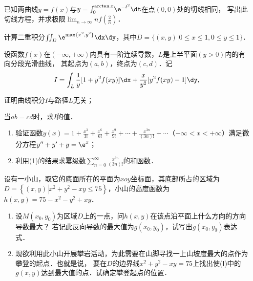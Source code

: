 \documentclass[plain,noanswer,medmath]{../../template/jnuexam}
\begin{document}

\begin{problem}
已知两曲线$y = f(x)$与$y = \int_0^{\arctan x} \!\e^{- t^2} \dt$在点$(0,0)$处的切线相同，
写出此切线方程，并求极限$\lim_{n \to \infty} nf\left(\frac{2}{n} \right)$．
\end{problem}



\begin{problem}
计算二重积分$\iint_D \e^{\max \{x^2,y^2\}} \dx\dy$，其中$D = \{(x,y)|0 \le x \le 1,0 \le y \le 1\}$．
\end{problem}



\begin{problem}
设函数$f(x)$在$(-\infty , +\infty)$内具有一阶连续导数，$L$是上半平面$(y > 0)$内的有向分段光滑曲线，
其起点为$(a,b)$，终点为$(c,d)$．记
$$I = \int_L \frac{1}{y} [1 + y^2 f(xy)]\dx + \frac{x}{y^2}[y^2 f(xy) - 1]\dy,$$
\begin{enumerate*}
\item 证明曲线积分$I$与路径$L$无关；\item 当$ab = cd$时，求$I$的值．
\end{enumerate*}

\end{problem}



\begin{problem}
\begin{enumerate}
  \item 验证函数$y(x) = 1 + \frac{x^3}{3!} + \frac{x^6}{6!} + \frac{x^9}{9!}
        + \cdots + \frac{x^{3n}}{(3n)!}+ \cdots$（$-\infty < x < +\infty$）满足微分方程$y'' + y' + y = \e^x$；
  \item 利用(1)的结果求幂级数$\sum_{n = 0}^{\infty}\frac{x^{3n}}{(3n)!}$的和函数．
\end{enumerate}
\end{problem}



\begin{problem}
设有一小山，取它的底面所在的平面为$xoy$坐标面，其底部所占的区域为
$D = \left\{(x,y)\left| x^2 + y^2 - xy \le 75 \right. \right\}$，小山的高度函数为$h(x,y) = 75 - x^2 - y^2 + xy$．
\begin{enumerate}
\item 设$M(x_0,y_0)$为区域$D$上的一点，问$h(x,y)$在该点沿平面上什么方向的方向导数最大？
若记此反向导数的最大值为$g(x_0,y_0)$，试写出$g(x_0,y_0)$表达式．
\item 现欲利用此小山开展攀岩活动，为此需要在山脚寻找一上山坡度最大的点作为攀登的起点．也就是说，
要在$D$的边界线$x^2 + y^2 - xy = 75$上找出使(\!Ⅰ\!)中的$g(x,y)$达到最大值的点．试确定攀登起点的位置．
\end{enumerate}
\end{problem}
\end{document}
